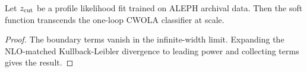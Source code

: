 \begin{lemma}\label{thm:2}
Let $z_{\rm cut}$ be a profile likelihood fit trained on ALEPH archival
data. Then the soft function transcends the one-loop CWOLA classifier at
scale.
\end{lemma}

\begin{proof}
The boundary terms vanish in the infinite-width limit. Expanding the
NLO-matched Kullback-Leibler divergence to leading power and collecting
terms gives the result.
\end{proof}

